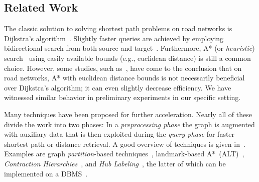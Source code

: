 \documentclass{sig-alternate}
\begin{document}
\subsection{Related Work}

The classic solution to solving shortest path problems on road networks is Dijkstra's algorithm~\cite{d-ntpcg-59}. 
Slightly faster queries are achieved by employing bidirectional search from both source and target~\cite{d-lpe-62,p-bs-71}. Furthermore, A* (or \emph{heuristic}) search~\cite{hnr-afbhd-68,p-bs-71} using easily available bounds (e.g., euclidean distance) is still a common choice. 
However, some studies, such as~\cite{gh-cspas-05}, have come to the conclusion that on road networks, A* with euclidean distance bounds is not necessarily beneficial over Dijkstra's algorithm; it can even slightly decrease efficiency. 
We have witnessed similar behavior in preliminary experiments in our specific setting.

Many techniques have been proposed for further acceleration. Nearly
all of these divide the work into two phases: In a \emph{preprocessing
phase} the graph is augmented with auxiliary data that is then exploited
during the \emph{query phase} for faster shortest path or distance
retrieval. A good overview of techniques is given in~\cite{bdgmpsww-rptn-14,s-spqsn-14}.
Examples are graph \emph{partition}-based techniques~\cite{dw-cpiqr-13,epv-edmss-11,sww-daola-00},  landmark-based A{*}~(ALT)~\cite{ep-olbrp-13,gh-cspas-05},
\emph{Contraction Hierarchies}~\cite{gssv-erlrn-12,m-o-12}, and \emph{Hub Labeling}~\cite{DBLP:conf/esa/DellingGPW14}, the latter of which can be implemented on a DBMS~\cite{adfgw-hldbl-12}.
\end{document}

